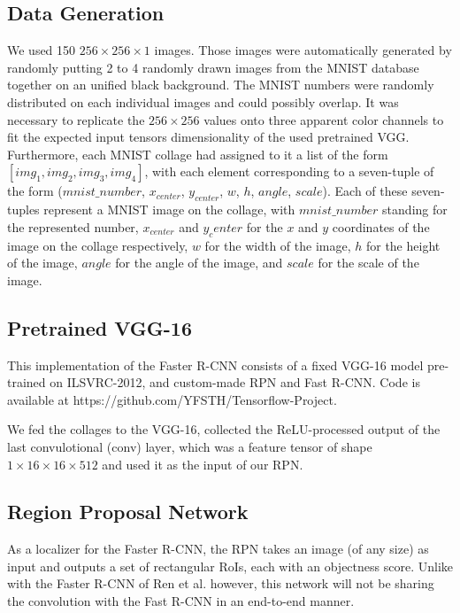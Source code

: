\documentclass[a4paper]{article}
\begin{document}
\subsection{Data Generation}
We used 150 $256 \times 256 \times 1$ images. Those images were automatically generated by randomly putting 2 to 4 randomly drawn images from the MNIST database together on an unified black background. The MNIST numbers were randomly distributed on each individual images and could possibly overlap. It was necessary to replicate the $256 \times 256$ values onto three apparent color channels to fit the expected input tensors dimensionality of the used pretrained VGG. Furthermore, each MNIST collage had assigned to it a list of the form $[img_1, img_2, img_3, img_4]$, with each element corresponding to a seven-tuple of the form ($mnist\_number$, $x_{center}$, $y_{center}$, $w$, $h$, $angle$, $scale$). Each of these seven-tuples represent a MNIST image on the collage, with $mnist\_number$ standing for the represented number, $x_{center}$ and $y_center$ for the $x$ and $y$ coordinates of the image on the collage respectively, $w$ for the width of the image, $h$ for the height of the image, $angle$ for the angle of the image, and $scale$ for the scale of the image.

\subsection{Pretrained VGG-16}
This implementation of the Faster R-CNN consists of a fixed VGG-16 model pre-trained on ILSVRC-2012, and custom-made RPN and Fast R-CNN. Code is available at https://github.com/YFSTH/Tensorflow-Project.

We fed the collages to the VGG-16, collected the ReLU-processed output of the last convulotional (conv) layer, which was a feature tensor of shape $1 \times 16 \times 16 \times 512$ and used it as the input of our RPN.

\subsection{Region Proposal Network}
As a localizer for the Faster R-CNN, the RPN takes an image (of any size) as input and outputs a set of rectangular RoIs, each with an objectness score. Unlike with the Faster R-CNN of Ren et al. \cite{fasterrcnn} however, this network will not be sharing the convolution with the Fast R-CNN in an end-to-end manner.
\end{document}
